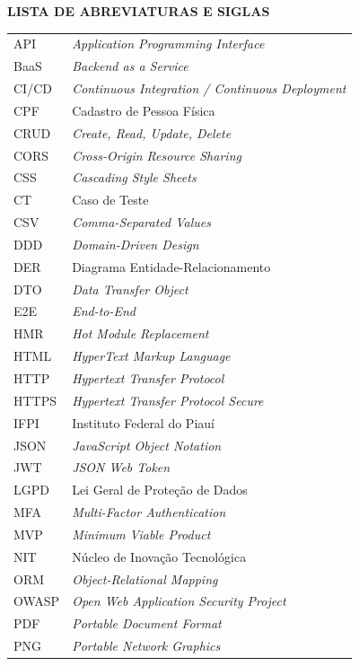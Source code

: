 \begin{center}
\textbf{LISTA DE ABREVIATURAS E SIGLAS}
\end{center}

\footnotesize
\renewcommand{\arraystretch}{0.85}
\begin{tabular}{@{}p{2.2cm}p{10.5cm}@{}}
API & \textit{Application Programming Interface} \\
BaaS & \textit{Backend as a Service} \\
CI/CD & \textit{Continuous Integration / Continuous Deployment} \\
CPF & Cadastro de Pessoa Física \\
CRUD & \textit{Create, Read, Update, Delete} \\
CORS & \textit{Cross-Origin Resource Sharing} \\
CSS & \textit{Cascading Style Sheets} \\
CT & Caso de Teste \\
CSV & \textit{Comma-Separated Values} \\
DDD & \textit{Domain-Driven Design} \\
DER & Diagrama Entidade-Relacionamento \\
DTO & \textit{Data Transfer Object} \\
E2E & \textit{End-to-End} \\
HMR & \textit{Hot Module Replacement} \\
HTML & \textit{HyperText Markup Language} \\
HTTP & \textit{Hypertext Transfer Protocol} \\
HTTPS & \textit{Hypertext Transfer Protocol Secure} \\
IFPI & Instituto Federal do Piauí \\
JSON & \textit{JavaScript Object Notation} \\
JWT & \textit{JSON Web Token} \\
LGPD & Lei Geral de Proteção de Dados \\
MFA & \textit{Multi-Factor Authentication} \\
MVP & \textit{Minimum Viable Product} \\
NIT & Núcleo de Inovação Tecnológica \\
ORM & \textit{Object-Relational Mapping} \\
OWASP & \textit{Open Web Application Security Project} \\
PDF & \textit{Portable Document Format} \\
PNG & \textit{Portable Network Graphics} \\

\end{tabular}
